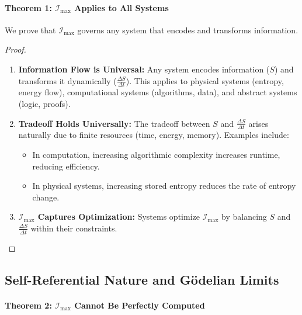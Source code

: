 \documentclass[12pt]{article}
\begin{document}
\paragraph{Theorem 1: \(\mathcal{I}_{\text{max}}\) Applies to All Systems}
We prove that \(\mathcal{I}_{\text{max}}\) governs any system that encodes and transforms information.

\begin{proof}
\begin{enumerate}
    \item \textbf{Information Flow is Universal:}
    Any system encodes information (\(S\)) and transforms it dynamically (\(\frac{\Delta S}{\Delta t}\)). This applies to physical systems (entropy, energy flow), computational systems (algorithms, data), and abstract systems (logic, proofs).
    
    \item \textbf{Tradeoff Holds Universally:}
    The tradeoff between \(S\) and \(\frac{\Delta S}{\Delta t}\) arises naturally due to finite resources (time, energy, memory). Examples include:
    \begin{itemize}
        \item In computation, increasing algorithmic complexity increases runtime, reducing efficiency.
        \item In physical systems, increasing stored entropy reduces the rate of entropy change.
    \end{itemize}
    
    \item \textbf{\(\mathcal{I}_{\text{max}}\) Captures Optimization:}
    Systems optimize \(\mathcal{I}_{\text{max}}\) by balancing \(S\) and \(\frac{\Delta S}{\Delta t}\) within their constraints.
\end{enumerate}
\end{proof}

\subsection{Self-Referential Nature and Gödelian Limits}

\paragraph{Theorem 2: \(\mathcal{I}_{\text{max}}\) Cannot Be Perfectly Computed}
\end{document}
